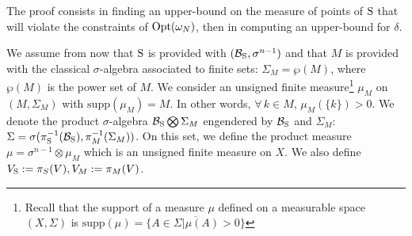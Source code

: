
The proof consists in finding an upper-bound on the measure of points of $\text{S}$ that will violate the constraints of $\text{Opt}(\omega_N)$, then in computing an upper-bound for $\delta$.

We assume from now that $\text{S}$ is provided with $(\mathcal{B}_{\text{S}},\sigma^{n-1})$ and that $M$ is provided with the classical $\sigma$-algebra associated to finite sets: $\Sigma_M = \wp(M)$, where $\wp(M)$ is the power set of $M$. We consider an unsigned finite measure\footnote{Recall that the support of a measure $\mu$ defined on a measurable space $(X, \Sigma)$ is $\text{supp}(\mu) = \overline{\{A \in \Sigma | \mu(A) > 0 \}}$} $\mu_M$ on $(M, \Sigma_M)$ with $\text{supp} (\mu_M) = M$. In other words, $\forall\,k \in M$, $\mu_M(\{k\})  > 0$. We denote the product $\sigma$-algebra $\mathcal{B}_{\text{S}} \bigotimes \Sigma_M$ engendered by $\mathcal{B}_{\text{S}}$ and $\Sigma_M$: $\Sigma = \sigma( \pi_{\text{S}}^{-1}(\mathcal{B}_{\text{S}}),  \pi_{M}^{-1}(\Sigma_M))$. On this set, we define the product measure $\mu = \sigma^{n-1} \otimes \mu_M$ which is an unsigned finite measure on $X$. We also define $V_{\text{S}}:=\pi_S(V), V_M:=\pi_M(V)$.